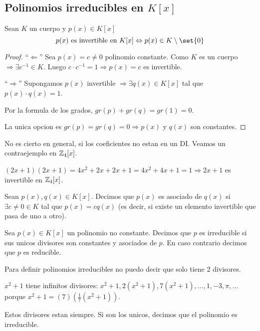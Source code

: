 \subsection{Polinomios irreducibles en \(K[x ]\)}
\begin{proposition}
	Sean \(K \) un cuerpo y \(p(x) \in K[x ]\)
	\[
		p(x) \text{ es invertible en } K[x] \iff p(x) \in K \setminus \set{0}
	\]
\end{proposition}
\begin{proof}
	``\(\Leftarrow \)'' Sea \(p(x) = c \neq 0 \) polinomio constante. Como \(K \) es un cuerpo \(\Rightarrow \exists c^{-1} \in K \). Luego \(c \cdot c^{-1} = 1 \Rightarrow p(x) = c \) es invertible.
	
	``\(\Rightarrow \)'' Supongamos \(p(x )\) invertible \(\Rightarrow \exists q(x) \in K[x ]\) tal que \(p(x) \cdot q(x) = 1 \).
	
	Por la formula de los grados, \(gr(p) + gr(q) = gr(1) = 0\).
	
	La unica opcion es \(gr(p) = gr(q) = 0 \Rightarrow p(x )\) y \(q(x )\) son constantes.
\end{proof}
\begin{remark}
	No es cierto en general, si los coeficientes no estan en un DI. Veamos un contraejemplo en \(\mathbb{Z}_4[x ]\).
	
	\((2x + 1)(2x + 1) = 4x^{2} + 2x + 2x + 1 = 4x^{2} + 4x + 1 = 1 \Rightarrow 2x + 1  \) es invertible en \(\mathbb{Z}_4[x ]\).
\end{remark}
\begin{definition}
	Sean \(p(x), q(x) \in K[x ]\). Decimos que \(p(x )\) es asociado de \(q(x )\) si \(\exists  c \neq 0 \in K \) tal que \(p(x) = cq(x )\) (es decir, si existe un elemento invertible que pasa de uno a otro).
\end{definition}
\begin{definition}
	Sea \(p(x) \in K[x ]\) un polinomio no constante. Decimos que \(p \) es irreducible si sus unicos divisores son constantes y asociados de \(p \). En caso contrario decimos que \(p \) es reducible.
\end{definition}
\begin{remark}
	Para definir polinomios irreducibles no puedo decir que solo tiene 2 divisores.
	
	\(x^{2} + 1 \) tiene infinitos divisores: \(x^{2} + 1, 2(x^{2} + 1 ), 7(x^{2} + 1 ), \ldots, 1, -3, \pi, \ldots \) porque \(x^{2} + 1 = (7)(\frac{1}{7} (x^{2} + 1 )) \).
	
	Estos divisores estan siempre. Si son los unicos, decimos que el polinomio es irreducible.
\end{remark}
